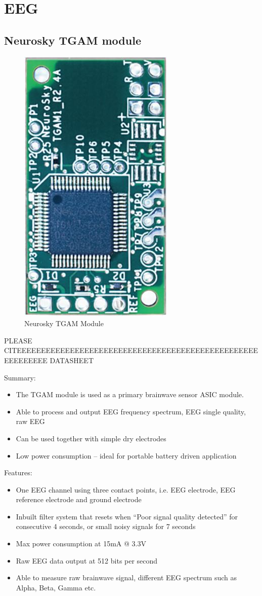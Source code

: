\section{EEG}

\subsection{Neurosky TGAM module}

\begin{figure}[H]
	\centering
	\includegraphics[width=0.3\linewidth,angle=270,origin=c]{jiahuipic2.jpg}
	\caption{Neurosky TGAM Module}
\end{figure}

PLEASE CITEEEEEEEEEEEEEEEEEEEEEEEEEEEEEEEEEEEEEEEEEEEEEEEEEEEEEEEEEEE DATASHEET

Summary:
\begin{itemize}
\item	The TGAM module is used as a primary brainwave sensor ASIC module.
\item	Able to process and output EEG frequency spectrum, EEG single quality, raw EEG 
\item	Can be used together with simple dry electrodes
\item	Low power consumption – ideal for portable battery driven application
\end{itemize}

Features:
\begin{itemize}
\item	One EEG channel using three contact points, i.e. EEG electrode, EEG reference electrode and ground electrode
\item	Inbuilt filter system that resets when “Poor signal quality detected” for consecutive 4 seconds, or small noisy signals for 7 seconds
\item	Max power consumption at 15mA @ 3.3V
\item	Raw EEG data output at 512 bits per second
\item	Able to measure raw brainwave signal, different EEG spectrum such as Alpha, Beta, Gamma etc. 
\end{itemize}

